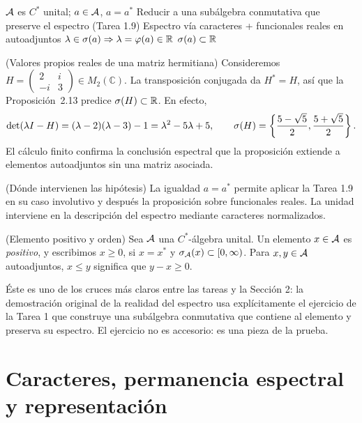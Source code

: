 \proofdiagrambranch
{$\mathcal A$ es $C^*$ unital; $a\in\mathcal A$, $a=a^*$}
{Reducir a una subálgebra conmutativa que preserve el espectro (Tarea 1.9)}
{Espectro vía caracteres + funcionales reales en autoadjuntos}
{$\lambda\in\sigma(a)\Rightarrow\lambda=\varphi(a)\in\mathbb R$}
{$\sigma(a)\subset\mathbb R$}

\begin{cthejemplo}{(Valores propios reales de una matriz hermitiana)}
Consideremos $H=\begin{pmatrix}2&i\\-i&3\end{pmatrix}\in M_2(\mathbb C)$.
La transposición conjugada da $H^*=H$, así que la Proposición~2.13 predice
$\sigma(H)\subset\mathbb R$. En efecto,
\[
 \det(\lambda I-H)=(\lambda-2)(\lambda-3)-1
 =\lambda^2-5\lambda+5,
 \qquad
 \sigma(H)=\left\{\frac{5-\sqrt5}{2},\frac{5+\sqrt5}{2}\right\}.
\]
El cálculo finito confirma la conclusión espectral que la proposición extiende
a elementos autoadjuntos sin una matriz asociada.
\end{cthejemplo}

\begin{cthnota}{(Dónde intervienen las hipótesis)}
La igualdad $a=a^*$ permite aplicar la Tarea 1.9 en su caso involutivo y después
la proposición sobre funcionales reales. La unidad interviene en la descripción
del espectro mediante caracteres normalizados.
\end{cthnota}


\begin{cthdefinicion}{(Elemento positivo y orden)}
Sea $\mathcal A$ una $C^*$-álgebra unital. Un elemento $x\in\mathcal A$ es \emph{positivo}, y escribimos
$x\ge0$, si $x=x^*$ y $\sigma_\mathcal A(x)\subset[0,\infty)$. Para $x,y\in\mathcal A$ autoadjuntos,
$x\le y$ significa que $y-x\ge0$.
\end{cthdefinicion}

\begin{puente}
Éste es uno de los cruces más claros entre las tareas y la Sección 2: la demostración original de la
realidad del espectro usa explícitamente el ejercicio de la Tarea 1 que construye una subálgebra
conmutativa que contiene al elemento y preserva su espectro. El ejercicio no es accesorio: es una
pieza de la prueba.
\end{puente}

\section{Caracteres, permanencia espectral y representación}


